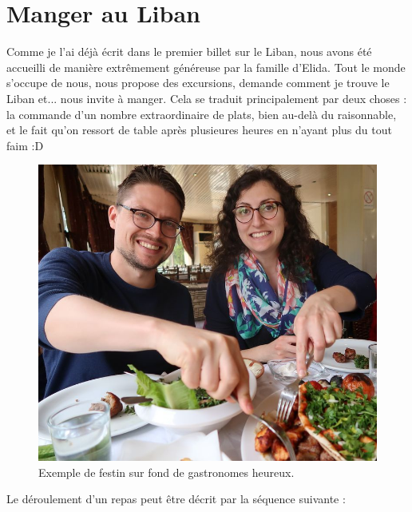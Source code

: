 \hypertarget{manger-au-liban}{%
\section{Manger au Liban}\label{manger-au-liban}}

Comme je l'ai déjà écrit dans le premier billet sur le Liban, nous avons
été accueilli de manière extrêmement généreuse par la famille d'Elida.
Tout le monde s'occupe de nous, nous propose des excursions, demande
comment je trouve le Liban et... nous invite à manger. Cela se traduit
principalement par deux choses : la commande d'un nombre extraordinaire
de plats, bien au-delà du raisonnable, et le fait qu'on ressort de table
après plusieures heures en n'ayant plus du tout faim :D

\begin{figure}
\centering
\includegraphics{images/20180523_manger.JPG}
\caption{Exemple de festin sur fond de gastronomes heureux.}
\end{figure}

Le déroulement d'un repas peut être décrit par la séquence suivante :

